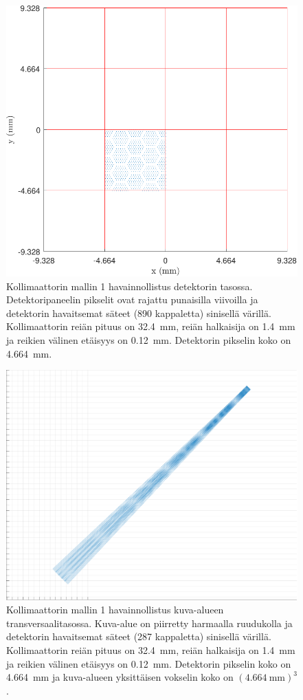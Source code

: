 \begin{figure}[H]
    \centering
    \captionsetup{width=.9\linewidth}
    \includegraphics[width=.9\linewidth]{kuvat/malli1_2D.pdf}
    \caption{Kollimaattorin mallin 1 havainnollistus detektorin tasossa. Detektoripaneelin pikselit ovat rajattu punaisilla viivoilla ja detektorin havaitsemat säteet (890 kappaletta) sinisellä värillä. Kollimaattorin reiän pituus on \qty{32.4}{\milli\meter}, reiän halkaisija on \qty{1.4}{\milli\meter} ja reikien välinen etäisyys on \qty{0.12}{\milli\meter}. Detektorin pikselin koko on \qty{4.664}{\milli\meter}.}
    \label{fig:ray1_2D}
\end{figure}
\begin{figure}[H]
    \centering
    \captionsetup{width=.9\linewidth}
    \includegraphics[width=.9\linewidth]{kuvat/malli1_3D.pdf}
    \caption{Kollimaattorin mallin 1 havainnollistus kuva-alueen transversaalitasossa. Kuva-alue on piirretty harmaalla ruudukolla ja detektorin havaitsemat säteet (287 kappaletta) sinisellä värillä. Kollimaattorin reiän pituus on \qty{32.4}{\milli\meter}, reiän halkaisija on \qty{1.4}{\milli\meter} ja reikien välinen etäisyys on \qty{0.12}{\milli\meter}. Detektorin pikselin koko on \qty{4.664}{\milli\meter} ja kuva-alueen yksittäisen vokselin koko on $(\qty{4.664}{\milli\meter})^{3}$.}
    \label{fig:ray1_3D}
\end{figure}
